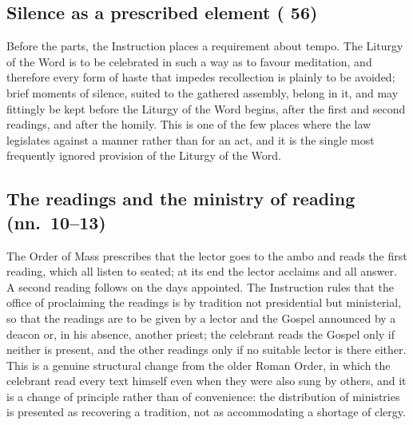 \subsection{Silence as a prescribed element ( 56)}

Before the parts, the Instruction places a requirement about tempo. The Liturgy of the Word is
to be celebrated in such a way as to favour meditation, and therefore every form of haste that
impedes recollection is plainly to be avoided; brief moments of silence, suited to the gathered
assembly, belong in it, and may fittingly be kept before the Liturgy of the Word begins, after
the first and second readings, and after the homily. This is one of the few places where the law legislates
against a manner rather than for an act, and it is the single most frequently ignored provision
of the Liturgy of the Word.

\subsection{The readings and the ministry of reading (nn.\ 10--13)}

The Order of Mass prescribes that the lector goes to the ambo and reads the first reading,
which all listen to seated; at its end the lector acclaims  and all
answer. A second reading follows on the days appointed. The
Instruction rules that the office of proclaiming the readings is by tradition not presidential
but ministerial, so that the readings are to be given by a lector and the Gospel announced by a
deacon or, in his absence, another priest; the celebrant reads the Gospel only if neither is
present, and the other readings only if no suitable lector is there either. This is a genuine structural
change from the older Roman Order, in which the celebrant read every text himself even when
they were also sung by others, and it is a change of principle rather than of convenience: the
distribution of ministries is presented as recovering a tradition, not as accommodating a
shortage of clergy.

